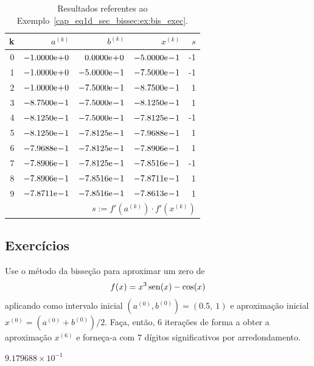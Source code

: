 \begin{ex}
\begin{table}[H]
  \centering
  \caption{Resultados referentes ao Exemplo~\ref{cap_eq1d_sec_bissec:ex:bis_exec}.}
  \begin{tabular}{r|rr|r|r}
    k & $a^{(k)}$ & $b^{(k)}$ & $x^{(k)}$ & $s$\\\hline
    0 & $-1.0000\mathrm{e}\!+\!0$ & $0.0000\mathrm{e}\!+\!0$ & $-5.0000\mathrm{e}\!-\!1$ & -1 \\
    1 & $-1.0000\mathrm{e}\!+\!0$ & $-5.0000\mathrm{e}\!-\!1$ & $-7.5000\mathrm{e}\!-\!1$ & -1 \\
    2 & $-1.0000\mathrm{e}\!+\!0$ & $-7.5000\mathrm{e}\!-\!1$ & $-8.7500\mathrm{e}\!-\!1$ & 1 \\
    3 & $-8.7500\mathrm{e}\!-\!1$ & $-7.5000\mathrm{e}\!-\!1$ & $-8.1250\mathrm{e}\!-\!1$ &  1 \\
    4 & $-8.1250\mathrm{e}\!-\!1$ & $-7.5000\mathrm{e}\!-\!1$ & $-7.8125\mathrm{e}\!-\!1$ & -1 \\
    5 & $-8.1250\mathrm{e}\!-\!1$ & $-7.8125\mathrm{e}\!-\!1$ & $-7.9688\mathrm{e}\!-\!1$ & 1 \\
    6 & $-7.9688\mathrm{e}\!-\!1$ & $-7.8125\mathrm{e}\!-\!1$ & $-7.8906\mathrm{e}\!-\!1$ & 1 \\
    7 & $-7.8906\mathrm{e}\!-\!1$ & $-7.8125\mathrm{e}\!-\!1$ & $-7.8516\mathrm{e}\!-\!1$ & -1 \\
    8 & $-7.8906\mathrm{e}\!-\!1$ & $-7.8516\mathrm{e}\!-\!1$ & $-7.8711\mathrm{e}\!-\!1$ & 1 \\
    9 & $-7.8711\mathrm{e}\!-\!1$ & $-7.8516\mathrm{e}\!-\!1$ & $-7.8613\mathrm{e}\!-\!1$ & 1 \\\hline
    \multicolumn{5}{r}{\small $s := f'(a^{(k)})\cdot f'(x^{(k)})$}
  \end{tabular}
  \label{cap_eq1d_sec_bissec:tab:bis_multpar}
\end{table}
\end{ex}

\subsection{Exercícios}

\begin{exer}
  Use o método da bisseção para aproximar um zero de
  \begin{equation}
    f(x)=x^3\operatorname{sen}(x)-\cos(x)
\end{equation}
aplicando como intervalo inicial $(a^{(0)}, b^{(0)}) = (0.5, ~1)$ e aproximação inicial $x^{(0)}=(a^{(0)}+b^{(0)})/2$. Faça, então, $6$ iterações de forma a obter a aproximação $x^{(6)}$ e forneça-a com $7$ dígitos significativos por arredondamento.
\end{exer}
\begin{resp}
  $9.179688\times 10^{-1}$
\end{resp}

